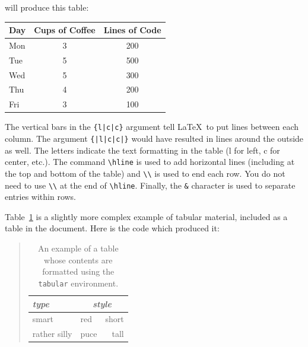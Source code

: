 will produce this table:

\begin{center}
\begin{tabular}{l|c|c}
Day & Cups of Coffee & Lines of Code \\
\hline
Mon & 3 & 200 \\
Tue & 5 & 500 \\
Wed & 5 & 300 \\
Thu & 4 & 200 \\
Fri & 3 & 100 \\
\end{tabular}
\end{center}

The vertical bars in the \verb+{l|c|c}+ argument tell \LaTeX\ to put
lines between each column. The argument \verb+{|l|c|c|}+ would have
resulted in lines around the outside as well. The letters indicate the
text formatting in the table (l for left, c for center, etc.).  The
command \verb|\hline| is used to add horizontal lines (including at
the top and bottom of the table) and \verb|\\| is used to end each
row.  You do not need to use \verb|\\| at the end of \verb|\hline|.
Finally, the {\tt \&} character is used to separate entries within
rows.

Table~\ref{tab:ex2} is a slightly more complex example of tabular
material, included as a table in the document.  Here is the code which
produced it:

\linespread{1}\small
\begin{quote}
\begin{listing}{1}
\begin{table}
\hrulefill
\caption[A tabular table]{An example of a table whose contents are
formatted using the {\tt tabular} environment.}
\label{tab:ex2}
\hrulefill
\begin{center}
\begin{tabular}{|l|l|r|} \hline\hline
{\em type} & \multicolumn{2}{c|}{\em style} \\ \hline
smart & red & short \\
rather silly & puce & tall \\ \hline\hline
\end{tabular}
\end{center}
\par
\bigskip
\hrulefill
\end{table}
\end{listing}
\end{quote}
\linespread{1.3}\normalsize

